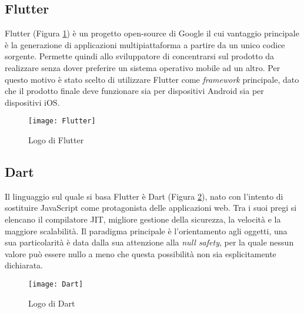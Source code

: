 \subsection{Flutter}
Flutter (Figura \ref{fig:flutter}) è un progetto open-source di Google il cui vantaggio principale è la generazione di applicazioni multipiattaforma a partire da un unico codice sorgente.\newline
Permette quindi allo sviluppatore di concentrarsi sul prodotto da realizzare senza dover preferire un sistema operativo mobile ad un altro.\newline
Per questo motivo è stato scelto di utilizzare Flutter come \emph{framework} principale, dato che il prodotto finale deve funzionare sia per dispositivi Android sia per dispositivi iOS.\newline
\begin{figure}[!h] 
    \centering
    \texttt{[image: Flutter]} 
    \caption{Logo di Flutter}\label{fig:flutter}
\end{figure}

\subsection{Dart}
Il linguaggio sul quale si basa Flutter è Dart (Figura \ref{fig:dart}), nato con l’intento di sostituire JavaScript come protagonista delle applicazioni web.\newline
Tra i suoi pregi si elencano il compilatore JIT, migliore gestione della sicurezza, la velocità e la maggiore scalabilità.\newline
Il paradigma principale è l’orientamento agli oggetti, una sua particolarità è data dalla sua attenzione alla \emph{null safety}, per la quale nessun valore può essere nullo a meno che questa possibilità non sia esplicitamente dichiarata.\newline
\begin{figure}[!h] 
    \centering 
    \texttt{[image: Dart]} 
    \caption{Logo di Dart}\label{fig:dart}
\end{figure}

